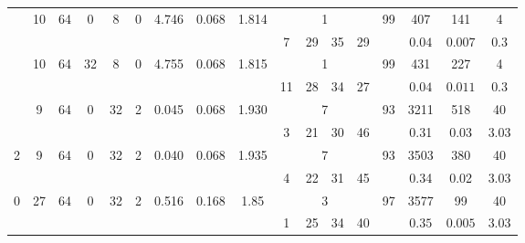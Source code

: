 \begin{landscape}
\begin{savenotes}
\begin{longtable}{ccccccccccccccccc}
\cmidrule{2-17} %

&  \multirow{2}{*}{10} & \multirow{2}{*}{64} & \multirow{2}{*}{0} & \multirow{2}{*}{8} & \multirow{2}{*}{0} & \multirow{2}{*}{4.746} & \multirow{2}{*}{0.068} & \multirow{2}{*}{1.814} & \multicolumn{4}{c}{1} & \multirow{2}{*}{99} & 407 & 141 & 4 \\
\cmidrule{10-13}
 & &  &  &  &  &  &  &  & 7 & 29 & 35 & 29 &  & $0.04$ & $0.007$ & 0.3 \\

 \cmidrule{2-17} %

 & \multirow{2}{*}{10} & \multirow{2}{*}{64} & \multirow{2}{*}{32} & \multirow{2}{*}{8} & \multirow{2}{*}{0} & \multirow{2}{*}{4.755} & \multirow{2}{*}{0.068} & \multirow{2}{*}{1.815} & \multicolumn{4}{c}{1} & \multirow{2}{*}{99} & 431 & 227 & 4 \\
\cmidrule{10-13}
 & &   &  &  &  &  &  &  & 11 & 28 & 34 & 27 &  & $0.04$ & $0.011$ & 0.3 \\




 \cmidrule{2-17} %

 & \multirow{2}{*}{9} & \multirow{2}{*}{64} & \multirow{2}{*}{0} & \multirow{2}{*}{32} & \multirow{2}{*}{2} & \multirow{2}{*}{0.045} & \multirow{2}{*}{0.068} & \multirow{2}{*}{1.930} & \multicolumn{4}{c}{7} & \multirow{2}{*}{93} & 3211 & 518 & 40 \\
\cmidrule{10-13}
 & &   &  &  &  &  &  &  & 3 & 21 & 30 & 46 &  & 0.31 & 0.03 & 3.03 \\




 \midrule  \midrule


\multirow{2}{*}{2} &
 \multirow{2}{*}{9} & \multirow{2}{*}{64} & \multirow{2}{*}{0} & \multirow{2}{*}{32} & \multirow{2}{*}{2} & \multirow{2}{*}{0.040} & \multirow{2}{*}{0.068} & \multirow{2}{*}{1.935} & \multicolumn{4}{c}{7} & \multirow{2}{*}{93} & 3503 & 380 & 40 \\
\cmidrule{10-13}
 & &   &  &  &  &  &  &  & 4 & 22 & 31 & 45 &  & 0.34 & 0.02 & 3.03 \\



 \midrule  \midrule

\multirow{4}{*}{0} &
 \multirow{2}{*}{27} & \multirow{2}{*}{64} & \multirow{2}{*}{0} & \multirow{2}{*}{32} & \multirow{2}{*}{2} & \multirow{2}{*}{0.516} & \multirow{2}{*}{0.168} & \multirow{2}{*}{1.85} & \multicolumn{4}{c}{3} & \multirow{2}{*}{97} & 3577 & 99 & 40 \\
\cmidrule{10-13}
 & &  &  &  &  &  &  &  & 1 & 25 & 34 & 40 &  & $0.35$ & $0.005$ & 3.03 \\



\end{longtable}
\end{savenotes}
\end{landscape}
